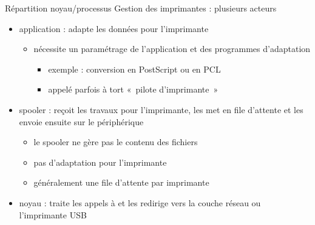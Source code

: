 \begin {frame} {Répartition noyau/processus}
    Gestion des imprimantes : plusieurs acteurs

    \begin {itemize}
	\item application : adapte les données pour l'imprimante

	    \begin {itemize}
		\item nécessite un paramétrage de l'application
		    et des programmes d'adaptation
		    \begin {itemize}
			\item exemple : conversion en
			    PostScript\texttrademark{}
			    ou en PCL\texttrademark
			\item appelé parfois à tort «~pilote d'imprimante~»
		    \end {itemize}
	    \end {itemize}

	\item spooler : reçoit les travaux pour l'imprimante, les met
	    en file d'attente et les envoie ensuite sur le périphérique

	    \begin {itemize}
		\item le spooler ne gère pas le contenu des fichiers
		\item pas d'adaptation pour l'imprimante
		\item généralement une file d'attente par imprimante
	    \end {itemize}

	\item noyau : traite les appels à  et les
	    redirige vers la couche réseau ou l'imprimante USB

    \end {itemize}
\end {frame}
